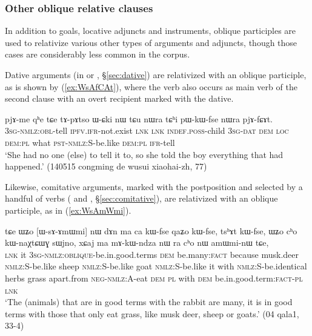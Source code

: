 \subsubsection{Other oblique relative clauses} \label{sec:other.oblique.participle.relatives}
In addition to goals, locative adjuncts and instruments, oblique participles are used to relativize various other types of arguments and adjuncts, though those cases are considerably less common in the corpus.

Dative arguments (in  or , §\ref{sec:dative}) are relativized with an oblique participle, as is shown by (\ref{ex:WsAfCAt}),  where the verb  also occurs as main verb of the second clause with an overt recipient marked with the dative.

\begin{exe}
\ex \label{ex:WsAfCAt}
\gll [ɯ-sɤ-fɕɤt] pjɤ-me qʰe tɕe tɤ-pɤtso ɯ-ɕki nɯ tɕu nɯra tɕʰi pɯ-kɯ-fse nɯra pjɤ-fɕɤt. \\
\textsc{3sg-nmlz:obl}-tell \textsc{ipfv.ifr}-not.exist \textsc{lnk} \textsc{lnk} \textsc{indef.poss}-child \textsc{3sg-dat} \textsc{dem} \textsc{loc} \textsc{dem:pl} what \textsc{pst-nmlz:S}-be.like  \textsc{dem:pl} \textsc{ifr}-tell \\
\glt `She had no one (else) to tell it to, so she told the boy everything that had happened.' (140515 congming de wusui xiaohai-zh, 77)
\end{exe} 

Likewise, comitative arguments, marked with the postposition  and selected by a handful of verbs ( and  , §\ref{sec:comitative}), are relativized with an oblique participle, as in (\ref{ex:WsAmWmi}).

\begin{exe}
   \ex \label{ex:WsAmWmi}
 \gll  tɕe ɯʑo [ɯ-sɤ-ɤmɯmi] nɯ dɤn ma ca kɯ-fse qaʑo kɯ-fse, tsʰɤt kɯ-fse,  ɯʑo cʰo kɯ-naχtɕɯɣ sɯjno, xɕaj ma mɤ-kɯ-ndza nɯ ra cʰo nɯ amɯmi-nɯ tɕe, \\
\textsc{lnk} it \textsc{3sg-nmlz:oblique}-be.in.good.terms \textsc{dem} be.many:\textsc{fact} because musk.deer \textsc{nmlz:S}-be.like sheep \textsc{nmlz:S}-be.like goat  \textsc{nmlz:S}-be.like it with  \textsc{nmlz:S}-be.identical herbs grass apart.from \textsc{neg-nmlz:A}-eat \textsc{dem} \textsc{pl} with \textsc{dem} be.in.good.term:\textsc{fact}-\textsc{pl} \textsc{lnk} \\
\glt `The (animals) that are in good terms with the rabbit are many, it is in good terms with those that only eat grass, like musk deer, sheep or goats.' (04 qala1, 33-4)
\end{exe}

